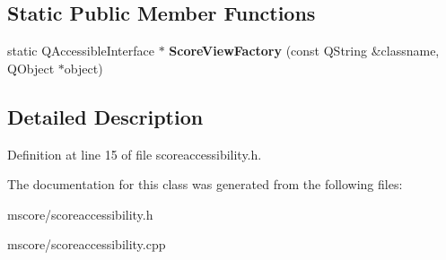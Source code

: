 \subsection*{Static Public Member Functions}
\begin{DoxyCompactItemize}
\item 
\mbox{\label{class_ms_1_1_accessible_score_view_a5c393cb22299b6392276856c2bc44acb}} 
static Q\+Accessible\+Interface $\ast$ {\bfseries Score\+View\+Factory} (const Q\+String \&classname, Q\+Object $\ast$object)
\end{DoxyCompactItemize}


\subsection{Detailed Description}


Definition at line 15 of file scoreaccessibility.\+h.



The documentation for this class was generated from the following files\+:\begin{DoxyCompactItemize}
\item 
mscore/scoreaccessibility.\+h\item 
mscore/scoreaccessibility.\+cpp\end{DoxyCompactItemize}
